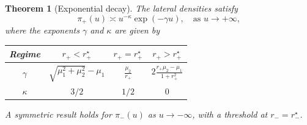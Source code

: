 \documentclass{article}
\theoremstyle{plain}
\newtheorem{theorem}{Theorem}[section]
\theoremstyle{definition}
\theoremstyle{remark}
\begin{document}
\begin{theorem}[Exponential decay]\label{thm:infty} The lateral densities satisfy
\begin{equation}\label{eq:asymptotics}
    \pi_+(u)\asymp u^{-\kappa}\exp(-\gamma u),\quad\text{as }u\to+\infty,
\end{equation}
where the exponents $\gamma$ and $\kappa$ are given by
\begin{center}
\renewcommand{\arraystretch}{1.3}
\begin{tabular}{|c|c|c|c|}
\hline
Regime & $r_+ < r_+^\star$ & $r_+ = r_+^\star$ & $r_+ > r_+^\star$ \\
\hline 
$\gamma$ \rule[-2.5ex]{0pt}{6.5ex} & $\displaystyle\sqrt{\mu_1^2+\mu_2^2}-\mu_1$& $\displaystyle\frac{\mu_2}{r_+}$ & $\displaystyle 2\frac{r_+\mu_2-\mu_1}{1+r_+^2}$\\
\hline
$\kappa$ & $3/2$ & $1/2$ & $0$ \\
\hline
\end{tabular}
\end{center}
A symmetric result holds for $\pi_-(u)$ as $u\to -\infty$, with a threshold at $r_-=r_-^\star$.
\end{theorem}
\end{document}
